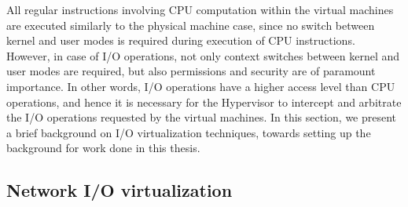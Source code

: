 All regular instructions involving CPU computation within the
virtual machines are executed similarly to the physical machine
case, since no
switch between kernel and user modes is required during execution of
CPU instructions. However, in case of I/O operations, not only 
context switches between kernel and user modes are required,
but also permissions and security are of paramount importance.
In other words, I/O operations have a higher access level
than CPU operations, and hence it is necessary for the Hypervisor
to intercept and arbitrate the I/O operations requested 
by the virtual machines. In this section, we present 
a brief background on I/O virtualization techniques, towards
setting up the background for work done in this thesis.

\subsection{Network I/O virtualization}


